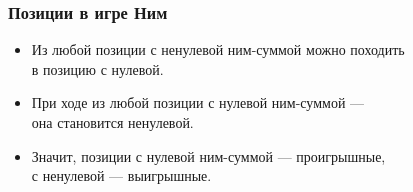 \begin{frame} \frametitle{Позиции в игре Ним}
\begin{itemize} \itemsep=5mm
	\item Из любой позиции с ненулевой ним-суммой можно походить \\
	в позицию с нулевой.
	\item При ходе из любой позиции с нулевой ним-суммой — \\
	она становится ненулевой.
	\item Значит, позиции с нулевой ним-суммой — проигрышные, \\
	с ненулевой — выигрышные.
\end{itemize}
\end{frame}
